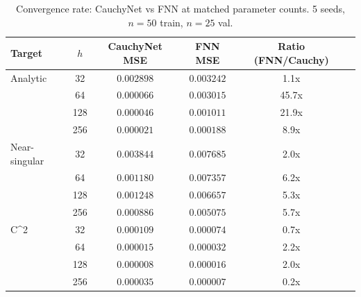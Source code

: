 \begin{table}[ht]\centering
\caption{Convergence rate: CauchyNet vs FNN at matched parameter counts. 5 seeds, $n=50$ train, $n=25$ val.}
\label{tab:convergence}
\begin{tabular}{lccccc}
\toprule
Target & $h$ & CauchyNet MSE & FNN MSE & Ratio (FNN/Cauchy) \\
\midrule
Analytic & 32 & $0.002898$ & $0.003242$ & 1.1x \\
 & 64 & $0.000066$ & $0.003015$ & 45.7x \\
 & 128 & $0.000046$ & $0.001011$ & 21.9x \\
 & 256 & $0.000021$ & $0.000188$ & 8.9x \\
\midrule
Near-singular & 32 & $0.003844$ & $0.007685$ & 2.0x \\
 & 64 & $0.001180$ & $0.007357$ & 6.2x \\
 & 128 & $0.001248$ & $0.006657$ & 5.3x \\
 & 256 & $0.000886$ & $0.005075$ & 5.7x \\
\midrule
C^2 & 32 & $0.000109$ & $0.000074$ & 0.7x \\
 & 64 & $0.000015$ & $0.000032$ & 2.2x \\
 & 128 & $0.000008$ & $0.000016$ & 2.0x \\
 & 256 & $0.000035$ & $0.000007$ & 0.2x 
\bottomrule
\end{tabular}
\end{table}